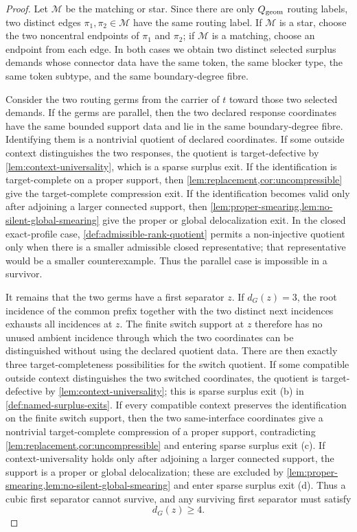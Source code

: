\documentclass[11pt]{article}
\begin{document}
\begin{proof}
Let \(\mathcal M\) be the matching or star.  Since there are only
\(Q_{\rm geom}\) routing labels, two distinct edges
\(\pi_1,\pi_2\in\mathcal M\) have the same routing label.  If \(\mathcal M\) is
a star, choose the two noncentral endpoints of \(\pi_1\) and \(\pi_2\); if
\(\mathcal M\) is a matching, choose an endpoint from each edge.  In both cases
we obtain two distinct selected surplus demands whose connector data have the
same token, the same blocker type, the same token subtype, and the same
boundary-degree fibre.

Consider the two routing germs from the carrier of \(t\) toward those two
selected demands.  If the germs are parallel, then the two declared response
coordinates have the same bounded support data and lie in the same
boundary-degree fibre.  Identifying them is a nontrivial quotient of declared
coordinates.  If some outside context distinguishes the two responses, the
quotient is target-defective by \cref{lem:context-universality}, which is a
sparse surplus exit.  If the identification is target-complete on a proper
support, then \cref{lem:replacement,cor:uncompressible} give the
target-complete compression exit.  If the identification becomes valid only
after adjoining a larger connected support, then
\cref{lem:proper-smearing,lem:no-silent-global-smearing} give the proper or
global delocalization exit.  In the closed exact-profile case,
\cref{def:admissible-rank-quotient} permits a non-injective quotient only when
there is a smaller admissible closed representative; that representative would
be a smaller counterexample.  Thus the parallel case is impossible in a
survivor.

It remains that the two germs have a first separator \(z\).  If \(d_G(z)=3\),
the root incidence of the common prefix together with the two distinct next
incidences exhausts all incidences at \(z\).  The finite switch support at
\(z\) therefore has no unused ambient incidence through which the two
coordinates can be distinguished without using the declared quotient data.
There are then exactly three target-completeness possibilities for the switch
quotient.  If some compatible outside context distinguishes the two switched
coordinates, the quotient is target-defective by
\cref{lem:context-universality}; this is sparse surplus exit (b) in
\cref{def:named-surplus-exits}.  If every compatible context preserves the
identification on the finite switch support, then the two same-interface
coordinates give a nontrivial target-complete compression of a proper support,
contradicting \cref{lem:replacement,cor:uncompressible} and entering sparse
surplus exit (c).  If context-universality holds only after adjoining a larger
connected support, the support is a proper or global delocalization; these are
excluded by \cref{lem:proper-smearing,lem:no-silent-global-smearing} and enter
sparse surplus exit (d).  Thus a cubic first separator cannot survive, and any
surviving first separator must satisfy
\[
d_G(z)\ge4 .
\]


\end{proof}
\end{document}
